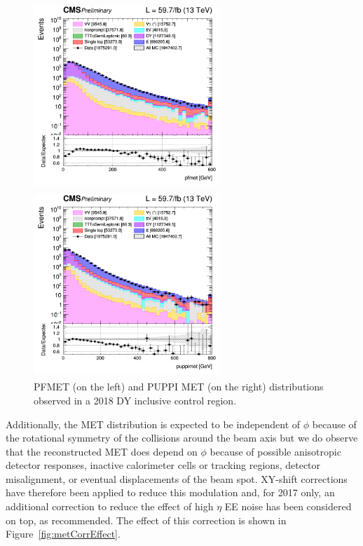 \documentclass[a4paper, 10pt, openright]{report}
\begin{document}
\begin{figure}[htbp]
\centering
\begin{minipage}[b]{.49\textwidth}
\includegraphics[width=7cm, height=7cm]{figs/2018/log_cratio_inclusiveCR_ll_pfmet.png}
\end{minipage}\hfill
\begin{minipage}[b]{.49\textwidth}
\includegraphics[width=7cm, height=7cm]{figs/2018/log_cratio_inclusiveCR_ll_puppimet.png}
\end{minipage} \hfill
\caption{PFMET (on the left) and \ac{PUPPI} \ac{MET} (on the right) distributions observed in a 2018 \ac{DY} inclusive control region.}
\label{fig:metStudy}
\end{figure}

Additionally, the \ac{MET} distribution is expected to be independent of $\phi$ because of the rotational symmetry of the collisions around the beam axis but we do observe that the reconstructed \ac{MET} does depend on $\phi$ because of possible anisotropic detector responses, inactive calorimeter cells or tracking regions, detector misalignment, or eventual displacements of the beam spot. XY-shift corrections have therefore been applied to reduce this modulation and, for 2017 only, an additional correction to reduce the effect of high $\eta$ EE noise has been considered on top, as recommended. The effect of this correction is shown in Figure~\ref{fig:metCorrEffect}.
\end{document}
